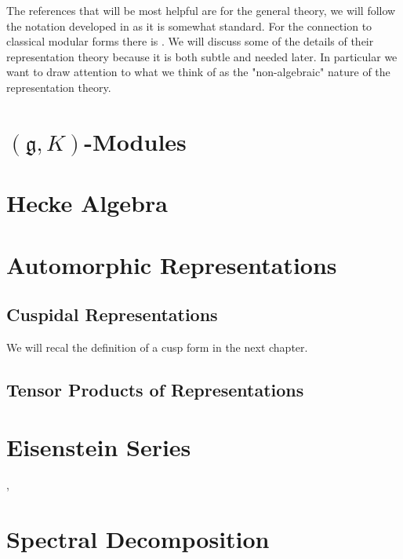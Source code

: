 The references that will be most helpful are \cite[I.II]{borelAutomorphicFormsRepresentations1979}\cite{getzIntroductionAutomorphicRepresentations2024} for the general theory, we will follow the notation developed in \cite{moeglinSpectralDecompositionEisenstein1995} as it is somewhat standard. For the connection to classical modular forms there is \cite{emertonCLASSICALMODULARFORMS}\cite{bumpAutomorphicFormsRepresentations1997}\cite{booherVIEWINGMODULARFORMS}\cite{garrettTransitionEisensteinSeries2016}. We will discuss some of the details of their representation theory because it is both subtle and needed later. In particular we want to draw attention to what we think of as the "non-algebraic" nature of the representation theory.

\section{\((\mathfrak{g}, K)\)-Modules}

\section{Hecke Algebra}

\section{Automorphic Representations}

\subsection{Cuspidal Representations}
We will recal the definition of a cusp form  in the next chapter.

\subsection{Tensor Products of Representations}

\section{Eisenstein Series}
\cite{lapidPerspectivesEisensteinSeries2022}, \cite{arthurEisensteinSeriesTrace1979}

\section{Spectral Decomposition}
